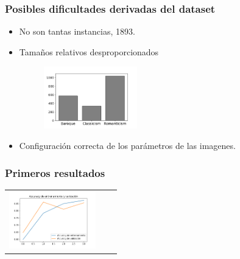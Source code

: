 \documentclass{beamer}
\theoremstyle{plain}
\newtheorem{obj2}[thm]{Objetivo [v2]}
\numberwithin{equation}{section} %
\numberwithin{figure}{section} %
\numberwithin{table}{section} %
\begin{document}
{\begin{frame}
{\begin{table}[h!]
\begin{center}
\begin{tabular}{ccc}
\\
\end{tabular}
\end{center}
\end{table}

}


\end{frame}



\begin{frame}
\frametitle{Posibles dificultades derivadas del dataset}
\justifying

\begin{itemize}[<+->]
\item No son tantas instancias, 1893.

\item Tama\~nos relativos desproporcionados
\begin{figure}[H]
\includegraphics[height=27mm]{histogram_periods.png}
\end{figure}


\item Configuraci\'on correcta de los par\'ametros de las imagenes.

\end{itemize}

\end{frame}


\begin{frame}
\frametitle{Primeros resultados}
\justifying

\begin{table}[h!]
\begin{center}
\begin{tabular}{ccc}

\begin{minipage}{.3\textwidth}
\includegraphics[width=\linewidth, height=25mm]{02-TA.png}
\end{minipage}


\end{tabular}
\end{center}
\end{table}
\end{frame}}
\end{document}
